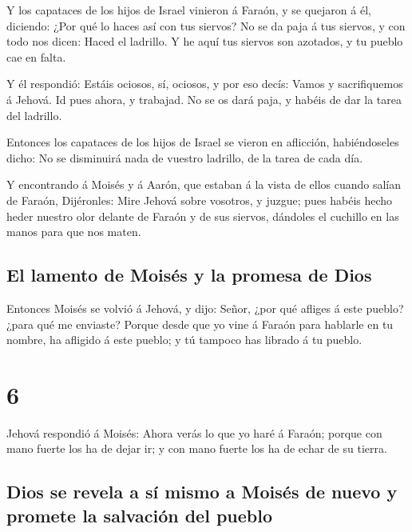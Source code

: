  Y los capataces de los hijos de Israel vinieron á Faraón,
y se quejaron á él, diciendo: ¿Por qué lo haces así con tus siervos?
 No se da paja á tus siervos, y con todo nos dicen: Haced
el ladrillo. Y he aquí tus siervos son azotados, y tu pueblo cae en
falta.

 Y él respondió: Estáis ociosos, sí, ociosos, y por eso
decís: Vamos y sacrifiquemos á Jehová.  Id pues ahora, y
trabajad. No se os dará paja, y habéis de dar la tarea del ladrillo.

 Entonces los capataces de los hijos de Israel se vieron en
aflicción, habiéndoseles dicho: No se disminuirá nada de vuestro
ladrillo, de la tarea de cada día.

 Y encontrando á Moisés y á Aarón, que estaban á la vista
de ellos cuando salían de Faraón,  Dijéronles: Mire Jehová
sobre vosotros, y juzgue; pues habéis hecho heder nuestro olor delante
de Faraón y de sus siervos, dándoles el cuchillo en las manos para que
nos maten.

\hypertarget{el-lamento-de-moisuxe9s-y-la-promesa-de-dios}{%
\subsection{El lamento de Moisés y la promesa de
Dios}\label{el-lamento-de-moisuxe9s-y-la-promesa-de-dios}}

 Entonces Moisés se volvió á Jehová, y dijo: Señor, ¿por
qué afliges á este pueblo? ¿para qué me enviaste?  Porque
desde que yo vine á Faraón para hablarle en tu nombre, ha afligido á
este pueblo; y tú tampoco has librado á tu pueblo.

\hypertarget{section-5}{%
\section{6}\label{section-5}}

 Jehová respondió á Moisés: Ahora verás lo que yo haré á
Faraón; porque con mano fuerte los ha de dejar ir; y con mano fuerte los
ha de echar de su tierra.

\hypertarget{dios-se-revela-a-suxed-mismo-a-moisuxe9s-de-nuevo-y-promete-la-salvaciuxf3n-del-pueblo}{%
\subsection{Dios se revela a sí mismo a Moisés de nuevo y promete la
salvación del
pueblo}\label{dios-se-revela-a-suxed-mismo-a-moisuxe9s-de-nuevo-y-promete-la-salvaciuxf3n-del-pueblo}}

